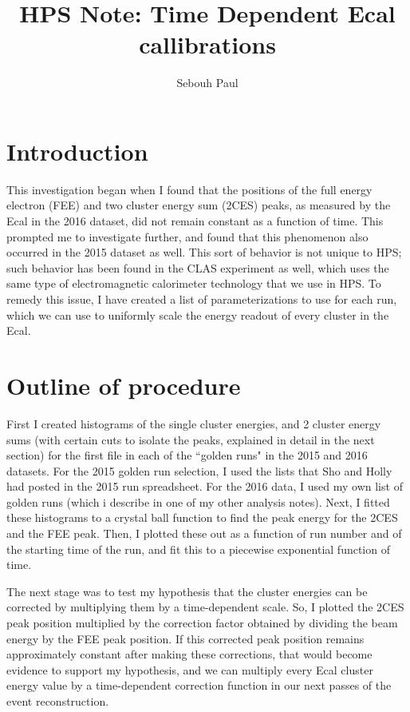 \documentclass[11pt]{article}
\title{HPS Note:  Time Dependent Ecal callibrations}
\author{Sebouh Paul}
\date{}                                           %
\begin{document}
\maketitle
\section{Introduction}
This investigation began when I found that the positions of the full energy electron (FEE) and two cluster energy sum (2CES) peaks, as measured by the Ecal in the 2016 dataset, did not remain constant as a function of time.   This prompted me to investigate further, and found that this phenomenon also occurred in the 2015 dataset as well.  This sort of behavior is not unique to HPS; such behavior has been found in the CLAS experiment as well, which uses the same type of electromagnetic calorimeter technology that we use in HPS.  To remedy this issue, I have created a list of parameterizations to use for each run, which we can use to uniformly scale the energy readout of every cluster in the Ecal.  

\section{Outline of procedure}
First I created histograms of the single cluster energies, and 2 cluster energy sums (with certain cuts to isolate the peaks, explained in detail in the next section) for the first file in each of the ``golden runs" in the 2015 and 2016 datasets.  For the 2015 golden run selection, I used the lists that Sho and Holly had posted in the 2015 run spreadsheet.  For the 2016 data, I used my own list of golden runs (which i describe in one of my other analysis notes).  Next, I fitted these histograms to a crystal ball function to find the peak energy for the 2CES and the FEE peak.  Then, I plotted these out as a function of run number and of the starting time of the run, and fit this to a piecewise exponential function of time. 

The next stage was to test my hypothesis that the cluster energies can be corrected by multiplying them by a time-dependent scale.  So, I plotted the 2CES peak position multiplied by the correction factor obtained by dividing the beam energy by the FEE peak position.  If this corrected peak position remains approximately constant after making these corrections, that would become evidence to support my hypothesis, and we can multiply every Ecal cluster energy value by a time-dependent correction function in our next passes of the event reconstruction.
\end{document}
